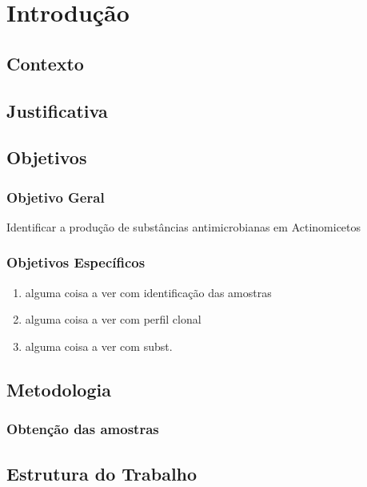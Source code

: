 \chapter{Introdução}
\label{cap:introducao}

\section{Contexto}



\section{Justificativa}


\section{Objetivos}

\subsection{Objetivo Geral}

Identificar a produção de substâncias antimicrobianas em Actinomicetos

\subsection{Objetivos Específicos}
\begin{enumerate}
    \item alguma coisa a ver com identificação das amostras %
    \item alguma coisa a ver com perfil clonal %
    \item alguma coisa a ver com subst. %
\end{enumerate}

\section{Metodologia}

\subsection{Obtenção das amostras}



\section{Estrutura do Trabalho}



